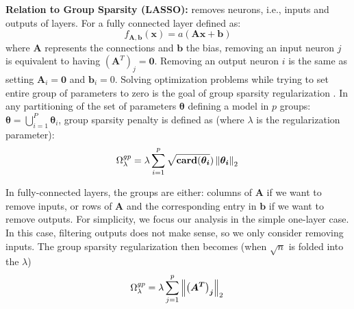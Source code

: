 \noindent\textbf{Relation to Group Sparsity (LASSO): } \shrink removes neurons,
i.e., inputs and outputs of layers. For a fully connected layer defined as:
%
\begin{equation} \label{fully_connected}
  f_{\bm{A}, \bm{b}}(\bm{x})=a(\bm{Ax + b})
\end{equation}
%
where $\bm{A}$ represents the connections and $\bm{b}$ the bias,
removing an input neuron $j$ is equivalent to having $\left(\bm{A}^T\right)_j =
\bm{0}$. Removing an output neuron $i$ is the same as setting $\bm{A}_i = \bm{0}$
and $\bm{b}_i = 0$. Solving optimization problems while trying to set entire
group of parameters to zero is the goal of group sparsity regularization
\cite{Scardapane2017}. 
In  any partitioning of the set of parameters $\bm{\theta}$ defining a model in $p$
groups: $\bm{\theta} = \bigcup_{i=1}^P \bm{\theta}_i$, group sparsity 
penalty is defined as (where $\lambda$ is the regularization parameter): 
%
\vspace{-0.1in}
\begin{equation}
    \label{full_def}
  \Omega_\lambda^{gp} = \lambda \sum_{i=1}^p \sqrt{\mathbf{card}(\bm{\theta_i}}) \left\lVert\bm{\theta_i}\right\rVert_2 \\
\end{equation}
\vspace{-0.2in}

In fully-connected layers, the groups are either: columns of
$\bm{A}$ if we want to remove inputs, or rows of $\bm{A}$ and the corresponding
entry in $\bm{b}$ if we want to remove outputs. For simplicity, we focus
our analysis in the simple one-layer case. In this case, filtering outputs does
not make sense, so we only consider removing inputs. The
group sparsity regularization then becomes (when $\sqrt{n}$ is folded into the $\lambda$)
%
\vspace{-0.1in}
\begin{equation} \label{group_sparsity_regularization}
  \Omega_\lambda^{gp} = \lambda \sum_{j=1}^p \left\lVert\bm{\left(A^T\right)_j}\right\rVert_2 \\
\end{equation}
\vspace{-0.2in}


